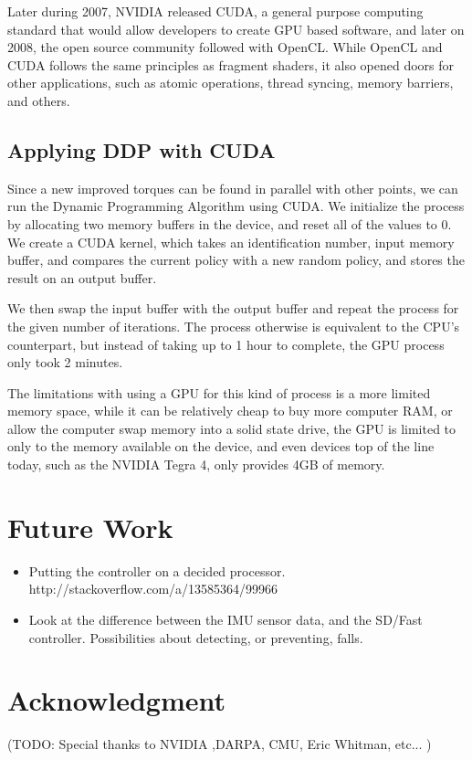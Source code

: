 \documentclass[12pt]{report}
\begin{document}
Later during 2007, NVIDIA released CUDA, a general purpose computing standard that would allow developers to create GPU based software, and later on 2008, the open source community followed with OpenCL. While OpenCL and CUDA follows the same principles as fragment shaders, it also opened doors for other applications, such as atomic operations, thread syncing, memory barriers, and others.

\subsection{Applying DDP with CUDA}
Since a new improved torques can be found in parallel with other points, we can run the Dynamic Programming Algorithm using CUDA.  We initialize the process by allocating two memory buffers in the device, and reset all of the values to 0.  We create a CUDA kernel, which takes an identification number, input memory buffer, and compares the current policy with a new random policy, and stores the result on an output buffer. 

We then swap the input buffer with the output buffer and repeat the process for the given number of iterations.  The process otherwise is equivalent to the CPU’s counterpart, but instead of taking up to 1 hour to complete, the GPU process only took 2 minutes. 

The limitations with using a GPU for this kind of process is a more limited memory space, while it can be relatively cheap to buy more computer RAM, or allow the computer swap memory into a solid state drive, the GPU is limited to only to the memory available on the device, and even devices top of the line today, such as the NVIDIA Tegra 4, only provides 4GB of memory. 

\section{Future Work}

\begin{itemize}
\item Putting the controller on a decided processor. http://stackoverflow.com/a/13585364/99966 
\item Look at the difference between the IMU sensor data, and the SD/Fast controller. Possibilities about detecting, or preventing, falls. 
\end{itemize}

\section{Acknowledgment}
(TODO: Special thanks to NVIDIA ,DARPA, CMU, Eric Whitman, etc... ) 
\end{document}
